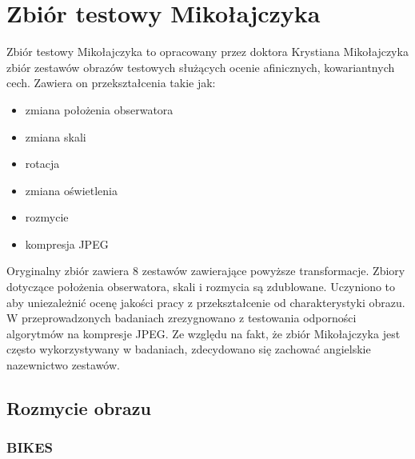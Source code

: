 \chapter{Zbiór testowy Mikołajczyka}
Zbiór testowy Mikołajczyka to opracowany przez doktora Krystiana Mikołajczyka zbiór zestawów obrazów testowych służących ocenie afinicznych, kowariantnych cech. Zawiera on przekształcenia takie jak:
\begin{itemize}
\item zmiana położenia obserwatora
\item zmiana skali 
\item rotacja
\item zmiana oświetlenia
\item rozmycie
\item kompresja JPEG
\end{itemize}
Oryginalny zbiór zawiera 8 zestawów zawierające powyższe transformacje. Zbiory dotyczące położenia obserwatora, skali i rozmycia są zdublowane. Uczyniono to aby uniezależnić ocenę jakości pracy z  przekształcenie od charakterystyki obrazu. W przeprowadzonych badaniach zrezygnowano z testowania odporności algorytmów na kompresje JPEG. Ze względu na fakt, że zbiór Mikołajczyka jest często wykorzystywany w badaniach, zdecydowano się zachować angielskie nazewnictwo zestawów.
\FloatBarrier
\newpage
\section{Rozmycie obrazu}
\FloatBarrier
\subsection{BIKES}

